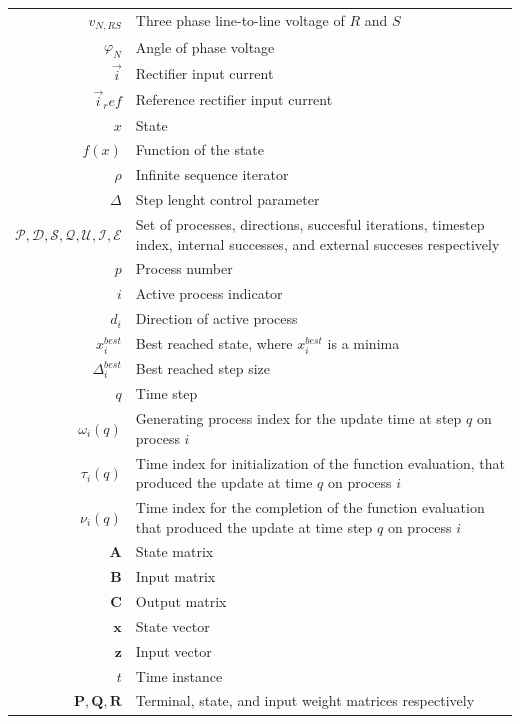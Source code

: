 \begin{tabularx}{\textwidth}{r|l}
	$v_{N,RS}$												& Three phase line-to-line voltage of $R$ and $S$\\
	$\varphi_N$												& Angle of phase voltage\\
	$\vec{i}$													& Rectifier input current\\
	$\vec{i}_ref$											& Reference rectifier input current\\
	$x$																& State\\
	$f(x)$														& Function of the state\\
	$\rho$																& Infinite sequence iterator\\
	$\Delta$													& Step lenght control parameter\\
	$\mathcal{P},\mathcal{D},\mathcal{S},\mathcal{Q},\mathcal{U},\mathcal{I},\mathcal{E}$ & Set of processes, directions, succesful iterations, timestep index, internal successes, and external succeses respectively\\
	$p$																& Process number\\
	$i$																& Active process indicator\\
	$d_i$															& Direction of active process\\
	$x_i^{best}$											& Best reached state, where $x_i^{best}$ is a minima\\
	$\Delta_i^{best}$											& Best reached step size\\
	$q$																& Time step\\
	$\omega_i(q)$ 										& Generating process index for the update time at step $q$ on process $i$\\
	$\tau_i(q)$												& Time index for initialization of the function evaluation, that produced the update at time $q$ on process $i$\\
	$\nu_i(q)$ 												& Time index for the completion of the function evaluation that produced the update at time step $q$ on process $i$\\
	$\textbf{A}$																& State matrix\\
	$\textbf{B}$																& Input matrix\\
	$\textbf{C}$																& Output matrix\\
	$\textbf{x}$											& State vector\\
	$\textbf{z}$											& Input vector\\
	$t$																& Time instance\\
	$\textbf{P}, \textbf{Q},\textbf{R}$ & Terminal, state, and input weight matrices respectively\\

\end{tabularx}
